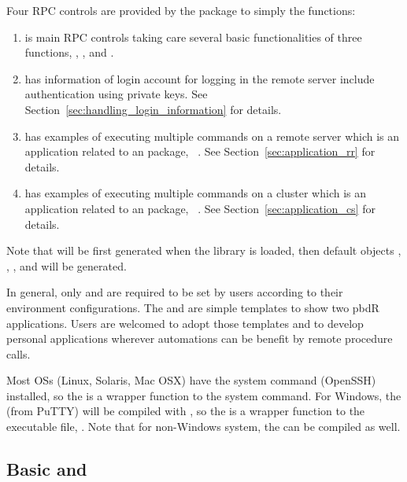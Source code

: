 Four RPC controls are provided by the package to simply the functions:
\begin{enumerate}
\item {} is main RPC controls taking care several basic
      functionalities of three functions, , , and
      .
\item {} has information of login account for logging in
      the remote server include authentication using private keys.
      See Section~\ref{sec:handling_login_information} for details.
\item {} has examples of executing multiple commands
      on a remote server which is an application related
      to an  package, ~\citep{remoter}. See
      Section~\ref{sec:application_rr} for details.
\item {} has examples of executing multiple commands
      on a  cluster which is an application related
      to an  package, ~\citep{pbdCS}. See
      Section~\ref{sec:application_cs} for details.
\end{enumerate}
Note that  will be first generated when the library 
is loaded, then default objects , , ,
and  will be generated.

In general, only  and  are required to be 
set by users according to their environment configurations.
The  and  are simple templates to show two
pbdR applications. Users are welcomed to adopt those templates and to
develop personal applications wherever automations can be benefit
by remote procedure calls.

Most OSs (Linux, Solaris, Mac OSX) have the system command  (OpenSSH)
installed, so the
 is a wrapper function to the system  command.
For Windows, the  (from PuTTY) will be compiled with
, so the  is a wrapper function to the
executable file, .
Note that for non-Windows system, the  can be compiled as well.


\subsection[Basic \code{ssh} and \code{srpc()}]{Basic  and }
\label{sec:basic_rpc}

